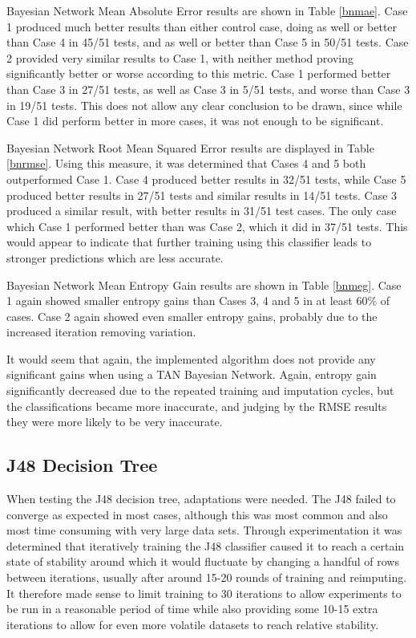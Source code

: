 Bayesian Network Mean Absolute Error results are shown in Table \ref{bnmae}. Case 1 produced much better results than either control case, doing as well or better than Case 4 in 45/51 tests, and as well or better than Case 5 in 50/51 tests. Case 2 provided very similar results to Case 1, with neither method proving significantly better or worse according to this metric. Case 1 performed better than Case 3 in 27/51 tests, as well as Case 3 in 5/51 tests, and worse than Case 3 in 19/51 tests. This does not allow any clear conclusion to be drawn, since while Case 1 did perform better in more cases, it was not enough to be significant.

Bayesian Network Root Mean Squared Error results are displayed in Table \ref{bnrmse}. Using this measure, it was determined that Cases 4 and 5 both outperformed Case 1. Case 4 produced better results in 32/51 tests, while Case 5 produced better results in 27/51 tests and similar results in 14/51 tests. Case 3 produced a similar result, with better results in 31/51 test cases. The only case which Case 1 performed better than was Case 2, which it did in 37/51 tests. This would appear to indicate that further training using this classifier leads to stronger predictions which are less accurate.

Bayesian Network Mean Entropy Gain results are shown in Table \ref{bnmeg}. Case 1 again showed smaller entropy gains than Cases 3, 4 and 5 in at least 60\% of cases. Case 2 again showed even smaller entropy gains, probably due to the increased iteration removing variation.

It would seem that again, the implemented algorithm does not provide any significant gains when using a TAN Bayesian Network. Again, entropy gain significantly decreased due to the repeated training and imputation cycles, but the classifications became more inaccurate, and judging by the RMSE results they were more likely to be very inaccurate.






\FloatBarrier

\subsection{J48 Decision Tree}
When testing the J48 decision tree, adaptations were needed. The J48 failed to converge as expected in most cases, although this was most common and also most time consuming with very large data sets. Through experimentation it was determined that iteratively training the J48 classifier caused it to reach a certain state of stability around which it would fluctuate by changing a handful of rows between iterations, usually after around 15-20 rounds of training and reimputing. It therefore made sense to limit training to 30 iterations to allow experiments to be run in a reasonable period of time while also providing some 10-15 extra iterations to allow for even more volatile datasets to reach relative stability.

